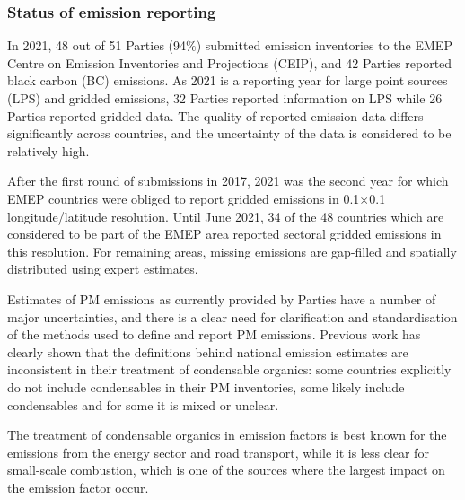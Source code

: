 \subsubsection*{Status of emission reporting}
In 2021, 48 out of 51 Parties (94$\%$) submitted emission inventories to the EMEP Centre on Emission Inventories and Projections (CEIP), and 42 Parties reported black carbon (BC) emissions. As 2021 is a reporting year for large point sources (LPS) and gridded emissions, 32 Parties reported information on LPS while 26 Parties reported gridded data. The quality of reported emission data differs significantly across countries, and the uncertainty of the data is considered to be relatively high.

After the first round of submissions in 2017, 2021 was the second year for which EMEP countries were obliged to report gridded emissions in  0.1{\degrees}$\times$0.1{\degrees} lon\-gi\-tude/la\-ti\-tude resolution. Until June 2021, 34 of the 48 countries which are considered to be part of the EMEP area reported sectoral gridded emissions in this resolution. For remaining areas, missing emissions are gap-filled and spatially distributed using expert estimates.

Estimates of PM emissions as currently provided by Parties have a number of major uncertainties, and there is a clear need for clarification and standardisation of the methods used to define and report PM emissions. 
Previous work has clearly shown that the definitions behind national emission estimates are inconsistent in their treatment of condensable organics: some countries explicitly do not include condensables in their PM inventories, some likely include condensables and for some it is mixed or unclear.

The treatment of condensable organics in emission factors is best known for the emissions from the energy sector and road transport, while it is less clear for small-scale combustion, which is one of the sources where the largest impact on the emission factor occur.

